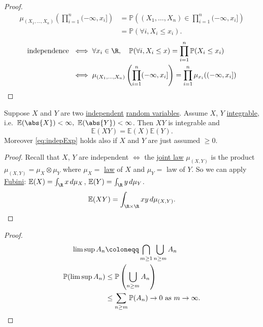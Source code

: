 \documentclass{article}
\newcommand{\1}[1]{\mathbbm{1}_{#1}}
\newcommand{\Prob}{\mathbb{P}}
\newcommand{\E}{\mathbb{E}}
\begin{document}
\begin{proof}
    \begin{align*}
        \mu_{(X_1, \dotsc, X_n)} \left(\prod_{i=1}^n (-\infty, x_i]\right) &= \Prob\left((X_1, \dotsc, X_n) \in \prod_{i=1}^n (-\infty, x_i]\right) \\
                                                                &= \Prob(\forall i, X_i \leq x_i).
    \end{align*}
    \begin{align*}
        \text{independence } &\iff \forall x_i \in \R, \quad \Prob(\forall i, X_i \leq x) = \prod_{i=1}^n \Prob(X_i \leq x_i) \\
                             &\iff \mu_{(X_1, \dotsc, X_n)} \left(\prod_{i=1}^n (-\infty, x_i]\right) = \prod_{i=1}^n \mu_{x_i} ((-\infty, x_i]) \qedhere %
    \end{align*}
\end{proof}


\begin{prop}
    Suppose $X$ and $Y$ are two \hyperlink{def:indepRV}{independent} \hyperlink{def:rv}{random variables}.
    Assume $X$, $Y$ \hyperlink{def:integral}{integrable}, i.e.\ $\E(\abs{X}) < \infty,\ \E(\abs{Y}) < \infty$.
    Then $XY$ is integrable and
    \begin{equation*}\E(XY) = \E(X)\E(Y).\tag{$*$}\label{eq:indepExp}\end{equation*}
    Moreover \eqref{eq:indepExp} holds also if $X$ and $Y$ are just assumed $\geq 0$.
\end{prop}

\begin{proof}
    Recall that $X$, $Y$ are independent $\iff$ the \hyperlink{def:jointLaw}{joint law} $\mu_{(X,Y)}$ is the product $\mu_{(X,Y)} = \mu_X \otimes \mu_Y$ where $\mu_X=$ \hyperlink{def:law}{law} of $X$ and $\mu_Y=$ law of $Y$.
    So we can apply \hyperlink{thm:tonelliFubini}{Fubini}: $\E(X) = \int_\R x \, d \mu_X$, $\E(Y) = \int_\R y \, d \mu_Y$.
    \begin{equation*}
        \E(XY) = \int_{\R \times \R} xy \, d\mu_{(X,Y)}. \qedhere
    \end{equation*}
\end{proof}

\begin{proof}
    \begin{align*}
        \limsup A_n &\coloneqq \bigcap_{m \geq 1} \bigcup_{n \geq m} A_n \\
        \Prob(\limsup A_n) &\leq \Prob\left(\bigcup_{n \geq m} A_n\right) \\
                             &\leq \sum_{n \geq m} \Prob(A_n) \to 0 \text{ as } m \to \infty.\qedhere
    \end{align*}
\end{proof}
\end{document}
